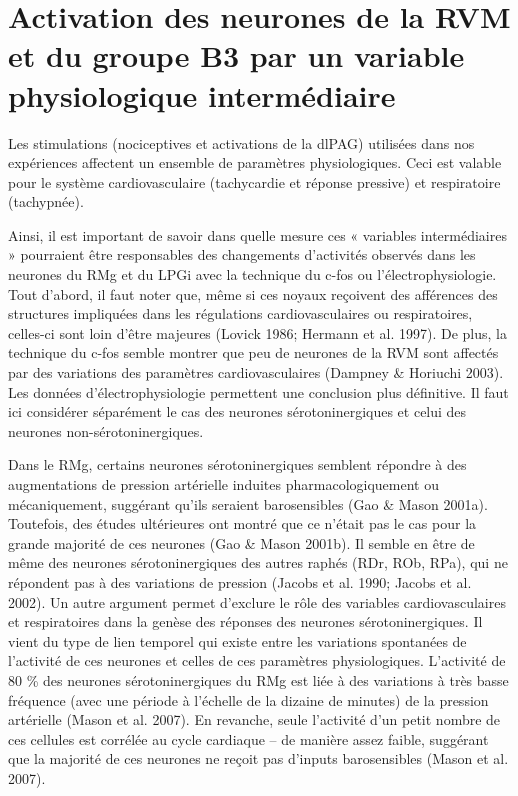 \documentclass[a4paper,12pt,twoside]{report}
\begin{document}
\section{Activation des neurones de la RVM et du groupe B3 par un variable physiologique intermédiaire}

Les stimulations (nociceptives et activations de la dlPAG) utilisées dans nos expériences affectent un ensemble de paramètres physiologiques. Ceci est valable pour le système cardiovasculaire (tachycardie et réponse pressive) et respiratoire (tachypnée).

Ainsi, il est important de savoir dans quelle mesure ces « variables intermédiaires » pourraient être responsables des changements d’activités observés dans les neurones du RMg et du LPGi avec la technique du c-fos ou l’électrophysiologie. Tout d’abord, il faut noter que, même si ces noyaux reçoivent des afférences des structures impliquées dans les régulations cardiovasculaires ou respiratoires, celles-ci sont loin d’être majeures (Lovick 1986; Hermann et al. 1997). De plus, la technique du c-fos semble montrer que peu de neurones de la RVM sont affectés par des variations des paramètres cardiovasculaires (Dampney \& Horiuchi 2003). Les données d’électrophysiologie permettent une conclusion plus définitive. Il faut ici considérer séparément le cas des neurones sérotoninergiques et celui des neurones non-sérotoninergiques. 

Dans le RMg, certains neurones sérotoninergiques semblent répondre à des augmentations de pression artérielle induites pharmacologiquement ou mécaniquement, suggérant qu’ils seraient barosensibles (Gao \& Mason 2001a). Toutefois, des études ultérieures ont montré que ce n’était pas le cas pour la grande majorité de ces neurones (Gao \& Mason 2001b). Il semble en être de même des neurones sérotoninergiques des autres raphés (RDr, ROb, RPa), qui ne répondent pas à des variations de pression (Jacobs et al. 1990; Jacobs et al. 2002). Un autre argument permet d’exclure le rôle des variables cardiovasculaires et respiratoires dans la genèse des réponses des neurones sérotoninergiques. Il vient du type de lien temporel qui existe entre les variations spontanées de l’activité de ces neurones et celles de ces paramètres physiologiques. L’activité de 80 \% des neurones sérotoninergiques du RMg est liée à des variations à très basse fréquence (avec une période à l’échelle de la dizaine de minutes) de la pression artérielle (Mason et al. 2007). En revanche, seule l’activité d’un petit nombre de ces cellules est corrélée au cycle cardiaque – de manière assez faible, suggérant que la majorité de ces neurones ne reçoit pas d’inputs barosensibles (Mason et al. 2007).
\end{document}
